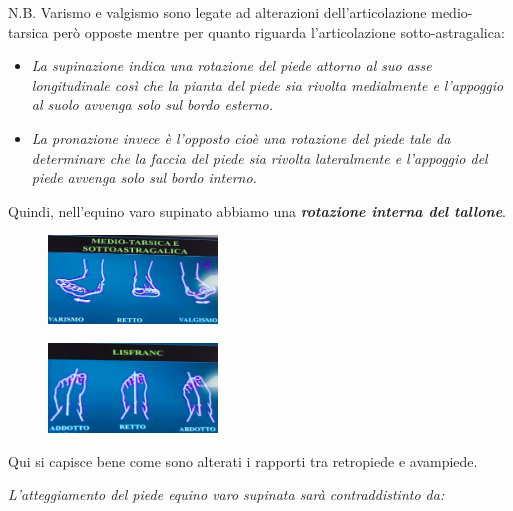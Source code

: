 N.B. Varismo e valgismo sono legate ad alterazioni dell'articolazione medio-tarsica però opposte mentre per quanto riguarda l'articolazione sotto-astragalica:

\begin{itemize}
\item
  \emph{La \emph{supinazione} indica una rotazione del piede attorno al suo asse longitudinale così che la pianta del piede sia rivolta medialmente e l'appoggio al suolo avvenga solo sul bordo esterno. }
\item
  \emph{La \emph{pronazione} invece è l'opposto cioè una rotazione del piede tale da determinare che la faccia del piede sia rivolta lateralmente e l'appoggio del piede avvenga solo sul bordo interno. }
\end{itemize}

Quindi, nell'equino varo supinato abbiamo una \textbf{\emph{rotazione interna del tallone}}.

\begin{figure}[!ht]
\centering
\includegraphics[width=0.4\textwidth]{016/image8.png}
\end{figure}

\begin{figure}[!ht]
\centering
\includegraphics[width=0.4\textwidth]{016/image9.png}
\end{figure}

Qui si capisce bene come sono alterati i rapporti tra retropiede e avampiede.

\emph{L'atteggiamento del piede equino varo supinata sarà
contraddistinto da:}

